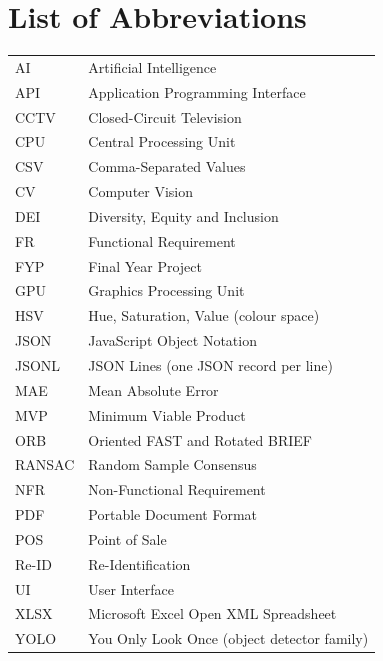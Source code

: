 \chapter*{List of Abbreviations}
\begin{tabular}{P{0.2\textwidth}P{0.7\textwidth}}
AI & Artificial Intelligence\\
API & Application Programming Interface\\
CCTV & Closed-Circuit Television\\
CPU & Central Processing Unit\\
CSV & Comma-Separated Values\\
CV & Computer Vision\\
DEI & Diversity, Equity and Inclusion\\
FR & Functional Requirement\\
FYP & Final Year Project\\
GPU & Graphics Processing Unit\\
HSV & Hue, Saturation, Value (colour space)\\
JSON & JavaScript Object Notation\\
JSONL & JSON Lines (one JSON record per line)\\
MAE & Mean Absolute Error\\
MVP & Minimum Viable Product\\
ORB & Oriented FAST and Rotated BRIEF\\
RANSAC & Random Sample Consensus\\
NFR & Non-Functional Requirement\\
PDF & Portable Document Format\\
POS & Point of Sale\\
Re-ID & Re-Identification\\
UI & User Interface\\
XLSX & Microsoft Excel Open XML Spreadsheet\\
YOLO & You Only Look Once (object detector family)\\
\end{tabular}

